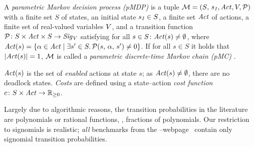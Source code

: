 
%
\begin{definition}\label{def:pmdp}
A \emph{parametric Markov decision process (pMDP)} is a tuple $\pMdpInit$ with a finite set $S$ of states, an initial state $\sinit \in S$, a finite set $\Act$ of actions, a finite set of real-valued variables $\Paramvar$, and a transition function $\probmdp \colon S \times \Act \times S \rightarrow \signomis[\Paramvar]$ satisfying for all $s\in S\colon
\Act(s) \neq \emptyset$,  where $\Act(s) = \{\act \in \Act \mid \exists s'\in S.\,\probmdp(s,\,\act,\,s') \neq 0\}$.
If for all $s\in S$ it holds that $|\Act(s)| = 1$, $\mdp$ is called a \emph{parametric discrete-time Markov chain (pMC)}%
.
\end{definition}
%
% 
%
$\Act(s)$ is the set of \emph{enabled} actions at state $s$; as $\Act(s) \neq \emptyset$, there are no deadlock states.
%
\emph{Costs} are defined using a state--action \emph{cost function} $\rewFunction \colon S \times \Act \rightarrow \R_{\geq 0}$.
\begin{remark}
Largely due to algorithmic reasons, the transition probabilities in the literature~\cite{param_sttt,dehnert-et-al-cav-2015,quatmann-et-al-atva-2016} are polynomials or rational functions, \ie, fractions of polynomials.  
 Our restriction to signomials is realistic; \emph{all} benchmarks from the --webpage~\cite{param_website} contain only signomial transition probabilities. 
\end{remark}

